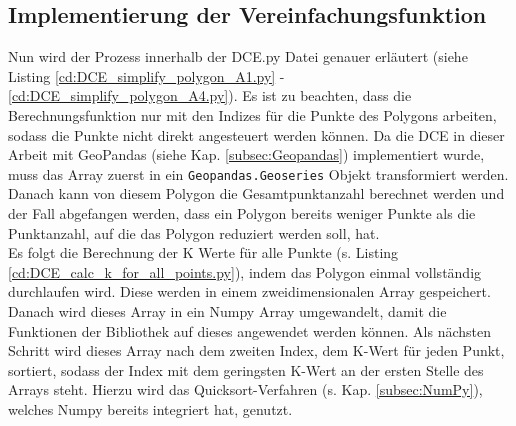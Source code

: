 {	\subsection{Implementierung der Vereinfachungsfunktion \label{impl:DCE_SimplyfierFunc}}

	

	Nun wird der Prozess innerhalb der DCE.py Datei genauer erläutert (siehe Listing \ref{cd:DCE_simplify_polygon_A1.py} - \ref{cd:DCE_simplify_polygon_A4.py}). Es ist zu beachten, dass die Berechnungsfunktion nur mit den Indizes für die Punkte des Polygons arbeiten, sodass die Punkte nicht direkt angesteuert werden können. Da die DCE in dieser Arbeit mit GeoPandas (siehe Kap. \ref{subsec:Geopandas}) implementiert wurde, muss das Array zuerst in ein \lstinline|Geopandas.Geoseries| Objekt transformiert werden. \\
	Danach kann von diesem Polygon die Gesamtpunktanzahl berechnet werden und der Fall abgefangen werden, dass ein Polygon bereits weniger Punkte als die Punktanzahl, auf die das Polygon reduziert werden soll, hat. \\

	

	
	Es folgt die Berechnung der K Werte für alle Punkte (s. Listing \ref{cd:DCE_calc_k_for_all_points.py}), indem das Polygon einmal vollständig durchlaufen wird. Diese werden in einem zweidimensionalen Array gespeichert. Danach wird dieses Array in ein Numpy Array umgewandelt, damit die Funktionen der Bibliothek auf dieses angewendet werden können. Als nächsten Schritt wird dieses Array nach dem zweiten Index, dem K-Wert für jeden Punkt, sortiert, sodass der Index mit dem geringsten K-Wert an der ersten Stelle des Arrays steht. Hierzu wird das Quicksort-Verfahren (s. Kap. \ref{subsec:NumPy}), welches Numpy bereits integriert hat, genutzt. \\

	


}
